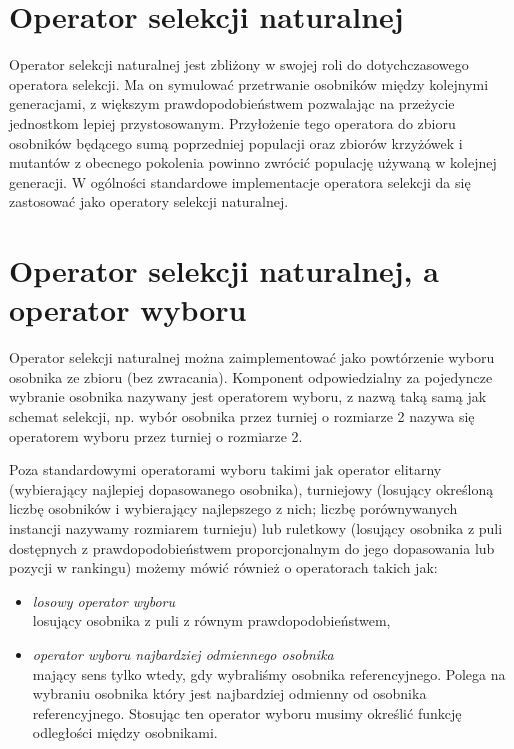 \documentclass[twoside]{iisthesis}
\begin{document}
\section{Operator selekcji naturalnej} \label{section_natSel}

Operator selekcji naturalnej jest zbliżony w swojej roli do dotychczasowego operatora selekcji. Ma on symulować przetrwanie osobników między kolejnymi generacjami, z większym prawdopodobieństwem pozwalając na przeżycie jednostkom lepiej przystosowanym. Przyłożenie tego operatora do zbioru osobników będącego sumą poprzedniej populacji oraz zbiorów krzyżówek i mutantów z obecnego pokolenia powinno zwrócić populację używaną w kolejnej generacji. W ogólności standardowe implementacje operatora selekcji da się zastosować jako operatory selekcji naturalnej.

\section{Operator selekcji naturalnej, a operator wyboru} \label{section_chooseOperator}

Operator selekcji naturalnej można zaimplementować jako powtórzenie wyboru osobnika ze zbioru (bez zwracania). Komponent odpowiedzialny za pojedyncze wybranie osobnika nazywany jest operatorem wyboru, z nazwą taką samą jak schemat selekcji, np. wybór osobnika przez turniej o rozmiarze 2 nazywa się operatorem wyboru przez turniej o rozmiarze 2.

Poza standardowymi operatorami wyboru takimi jak operator elitarny (wybierający najlepiej dopasowanego osobnika), turniejowy (losujący określoną liczbę osobników i wybierający najlepszego z nich; liczbę porównywanych instancji nazywamy rozmiarem turnieju) lub ruletkowy (losujący osobnika z puli dostępnych z prawdopodobieństwem proporcjonalnym do jego dopasowania lub pozycji w rankingu) możemy mówić również o operatorach takich jak:
\begin{itemize}
	\item \emph{losowy operator wyboru} \\ losujący osobnika z puli z równym prawdopodobieństwem,
	\item \emph{operator wyboru najbardziej odmiennego osobnika} \\ mający sens tylko wtedy, gdy wybraliśmy osobnika referencyjnego. Polega na wybraniu osobnika który jest najbardziej odmienny od osobnika referencyjnego. Stosując ten operator wyboru musimy określić funkcję odległości między osobnikami.
\end{itemize}
\end{document}
